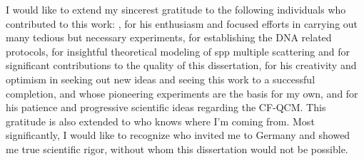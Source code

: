 I would like to extend my sincerest gratitude to the following individuals who
contributed to this work: , for his enthusiasm and focused
efforts in carrying out many tedious but necessary experiments,
 for establishing the DNA related protocols,
 for insightful theoretical modeling of \gls{spp} multiple
scattering and for significant contributions to the quality of this
dissertation,  for his creativity and optimism in seeking
out new ideas and seeing this work to a successful completion,
 and  whose pioneering
experiments are the basis for my own, and  for his patience and
progressive scientific ideas regarding the CF-QCM\@. This gratitude is also
extended to  who knows where I'm coming from.  Most
significantly, I would like to recognize  who invited me
to Germany and showed me true scientific rigor, without whom this dissertation
would not be possible.
